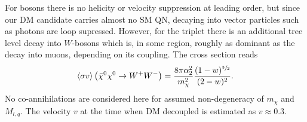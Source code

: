 For bosons there is no helicity or velocity suppression at leading order, but since our DM candidate carries almost no SM QN, decaying into vector
particles such as photons are loop supressed. However, for the triplet there is an additional tree level decay into $W$-bosons which is, in some 
region, roughly as dominant as the decay into muons, depending on its coupling. The cross section reads\cite{1401.6212}
\begin{align}
 \langle \sigma v \rangle \left(\bar \chi^0 \chi^0 \rightarrow W^+W^-\right) = \frac{8\pi \alpha_2^2}{m_\chi^2} \frac{(1-w)^{\sfrac32}}{(2-w)^2}.
\end{align}
No co-annihilations are considered here for assumed non-degeneracy of $m_\chi$ and $M_{l,q}$. The velocity $v$ at the time when DM decoupled is
estimated as $v\approx 0.3$. 

